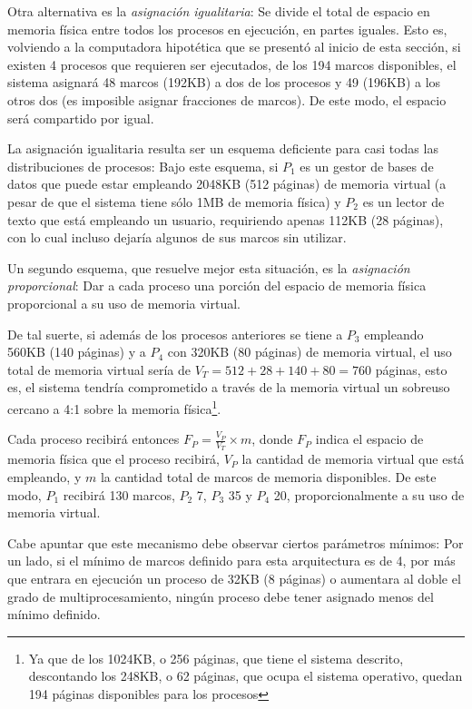 \documentclass[11pt,fleqn]{book} %
\begin{document}
Otra alternativa es la \emph{asignación igualitaria}: Se divide el total de
espacio en memoria física entre todos los procesos en ejecución, en
partes iguales. Esto es, volviendo a la computadora hipotética que
se presentó al inicio de esta sección, si existen 4 procesos que
requieren ser ejecutados, de los 194 marcos disponibles, el sistema
asignará 48 marcos (192KB) a dos de los procesos y 49 (196KB) a los
otros dos (es imposible asignar fracciones de marcos). De este modo,
el espacio será compartido por igual.

La asignación igualitaria resulta ser un esquema deficiente para casi
todas las distribuciones de procesos: Bajo este esquema, si $P_1$ es
un gestor de bases de datos que puede estar empleando 2048KB (512
páginas) de memoria virtual (a pesar de que el sistema tiene sólo 1MB
de memoria física) y $P_2$ es un lector de texto que está empleando un
usuario, requiriendo apenas 112KB (28 páginas), con lo cual incluso
dejaría algunos de sus marcos sin utilizar.

Un segundo esquema, que resuelve mejor esta situación, es la
\emph{asignación proporcional}: Dar a cada proceso una porción del espacio
de memoria física proporcional a su uso de memoria virtual.

De tal suerte, si además de los procesos anteriores se tiene a $P_3$
empleando 560KB (140 páginas) y a $P_4$ con 320KB (80 páginas) de
memoria virtual, el uso total de memoria virtual sería de $V_T = 512 +
28 + 140 + 80 = 760$ páginas, esto es, el sistema tendría comprometido
a través de la memoria virtual un sobreuso cercano a 4:1 sobre la
memoria física\footnote{Ya que de los 1024KB, o 256 páginas, que
tiene el sistema descrito, descontando los 248KB, o 62 páginas, que ocupa
el sistema operativo, quedan 194 páginas disponibles para los
procesos }.

Cada proceso recibirá entonces $F_P = \frac{V_P}{V_T} \times m$, donde
$F_P$ indica el espacio de memoria física que el proceso recibirá,
$V_P$ la cantidad de memoria virtual que está empleando, y $m$ la
cantidad total de marcos de memoria disponibles. De este modo, $P_1$
recibirá 130 marcos, $P_2$ 7, $P_3$ 35 y $P_4$ 20, proporcionalmente a
su uso de memoria virtual.

Cabe apuntar que este mecanismo debe observar ciertos parámetros
mínimos: Por un lado, si el mínimo de marcos definido para esta
arquitectura es de 4, por más que entrara en ejecución un proceso de
32KB (8 páginas) o aumentara al doble el grado de multiprocesamiento,
ningún proceso debe tener asignado menos del mínimo definido.
\end{document}
